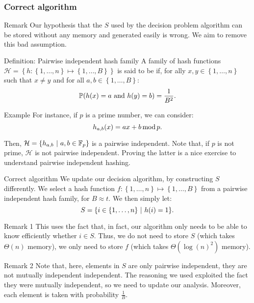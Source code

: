 \documentclass[a4paper]{article}
\begin{document}
\subsubsection{Correct algorithm}

\begin{parag}{Remark}
    Our hypothesis that the $S$ used by the decision problem algorithm can be stored without any memory and generated easily is wrong. We aim to remove this bad assumption.
\end{parag}

\begin{parag}{Definition: Pairwise independent hash family}
    A family of hash functions $\mathcal{H} = \left\{h: \left\{1, \ldots, n\right\} \mapsto \left\{1, \ldots, B\right\}\right\}$ is said to be  if, for ally $x, y \in \left\{1, \ldots, n\right\}$ such that $x \neq y$ and for all $a, b \in \left\{1, \ldots, B\right\}$: 
    \[\prob\left(h\left(x\right) = a \text{ and } h\left(y\right) = b\right) = \frac{1}{B^2}.\]
    
    \begin{subparag}{Example}
        For instance, if $p$ is a prime number, we can consider: 
        \[h_{a, b}\left(x\right) = ax + b \Mod p.\]

        Then, $\mathcal{H} = \left\{h_{a, b} \suchthat a, b \in \mathbb{F}_p\right\}$ is a pairwise independent. Note that, if $p$ is not prime, $\mathcal{H}$ is not pairwise independent. Proving the latter is a nice exercise to understand pairwise independent hashing.
    \end{subparag}
\end{parag}

\begin{parag}{Correct algorithm}
    We update our decision algorithm, by constructing $S$ differently. We select a hash function $f: \left\{1, \ldots, n\right\} \mapsto \left\{1, \ldots, B\right\}$ from a pairwise independent hash family, for $B \approx t$. We then simply let: 
    \[S = \left\{i \in \left\{1, \ldots, n\right\} \suchthat h\left(i\right) = 1\right\}.\]

    \begin{subparag}{Remark 1}
        This uses the fact that, in fact, our algorithm only needs to be able to know efficiently whether $i \in S$. Thus, we do not need to store $S$ (which takes $\Theta\left(n\right)$ memory), we only need to store $f$ (which takes $\Theta\left(\log\left(n\right)^2\right)$ memory).
    \end{subparag}

    \begin{subparag}{Remark 2}
        Note that, here, elements in $S$ are only pairwise independent, they are not mutually independent independent. The reasoning we used exploited the fact they were mutually independent, so we need to update our analysis. Moreover, each element is taken with probability $\frac{1}{B}$.
    \end{subparag}
\end{parag}
\end{document}
